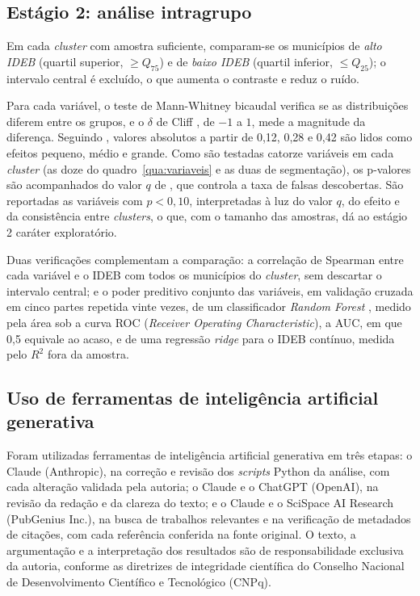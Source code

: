\subsection{Estágio 2: análise intragrupo}

Em cada \textit{cluster} com amostra suficiente, comparam-se os municípios de \textit{alto IDEB} (quartil superior, $\geq Q_{75}$) e de \textit{baixo IDEB} (quartil inferior, $\leq Q_{25}$); o intervalo central é excluído, o que aumenta o contraste e reduz o ruído.

Para cada variável, o teste de Mann-Whitney \parencite{mannwhitney1947} bicaudal verifica se as distribuições diferem entre os grupos, e o $\delta$ de Cliff \parencite{cliff1993}, de $-1$ a $1$, mede a magnitude da diferença. Seguindo \textcite{vargha2000}, valores absolutos a partir de 0,12, 0,28 e 0,42 são lidos como efeitos pequeno, médio e grande. Como são testadas catorze variáveis em cada \textit{cluster} (as doze do quadro~\ref{qua:variaveis} e as duas de segmentação), os p-valores são acompanhados do valor $q$ de \textcite{benjamini1995}, que controla a taxa de falsas descobertas. São reportadas as variáveis com $p < 0{,}10$, interpretadas à luz do valor $q$, do efeito e da consistência entre \textit{clusters}, o que, com o tamanho das amostras, dá ao estágio 2 caráter exploratório.

Duas verificações complementam a comparação: a correlação de Spearman entre cada variável e o IDEB com todos os municípios do \textit{cluster}, sem descartar o intervalo central; e o poder preditivo conjunto das variáveis, em validação cruzada em cinco partes repetida vinte vezes, de um classificador \textit{Random Forest} \parencite{breiman2001}, medido pela área sob a curva ROC (\textit{Receiver Operating Characteristic}), a AUC, em que 0,5 equivale ao acaso, e de uma regressão \textit{ridge} para o IDEB contínuo, medida pelo $R^2$ fora da amostra.

\subsection{Uso de ferramentas de inteligência artificial generativa}
\label{sec:uso_ia}

Foram utilizadas ferramentas de inteligência artificial generativa em três etapas: o Claude (Anthropic), na correção e revisão dos \textit{scripts} Python da análise, com cada alteração validada pela autoria; o Claude e o ChatGPT (OpenAI), na revisão da redação e da clareza do texto; e o Claude e o SciSpace AI Research (PubGenius Inc.), na busca de trabalhos relevantes e na verificação de metadados de citações, com cada referência conferida na fonte original. O texto, a argumentação e a interpretação dos resultados são de responsabilidade exclusiva da autoria, conforme as diretrizes de integridade científica do Conselho Nacional de Desenvolvimento Científico e Tecnológico (CNPq).
